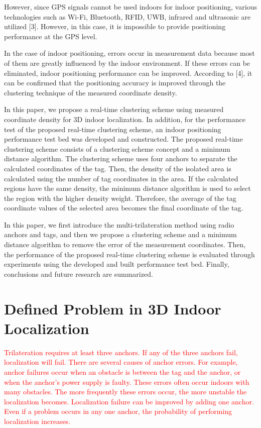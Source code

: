\documentclass[conference]{IEEEtran}
\begin{document}
However, since GPS signals cannot be used indoors for indoor positioning, various technologies such as Wi-Fi, Bluetooth, RFID, UWB, infrared and ultrasonic are utilized [3]. However, in this case, it is impossible to provide positioning performance at the GPS level.

In the case of indoor positioning, errors occur in measurement data because most of them are greatly influenced by the indoor environment. If these errors can be eliminated, indoor positioning performance can be improved. According to [4], it can be confirmed that the positioning accuracy is improved through the clustering technique of the measured coordinate density.

In this paper, we propose a real-time clustering scheme using measured coordinate density for 3D indoor localization. In addition, for the performance test of the proposed real-time clustering scheme, an indoor positioning performance test bed was developed and constructed. The proposed real-time clustering scheme consists of a clustering scheme concept and a minimum distance algorithm. The clustering scheme uses four anchors to separate the calculated coordinates of the tag. Then, the density of the isolated area is calculated using the number of tag coordinates in the area. If the calculated regions have the same density, the minimum distance algorithm is used to select the region with the higher density weight. Therefore, the average of the tag coordinate values of the selected area becomes the final coordinate of the tag.

In this paper, we first introduce the multi-trilateration method using radio anchors and tags, and then we propose a clustering scheme and a minimum distance algorithm to remove the error of the measurement coordinates. Then, the performance of the proposed real-time clustering scheme is evaluated through experiments using the developed and built performance test bed. Finally, conclusions and future research are summarized.


\section{Defined Problem in 3D Indoor Localization}

\textcolor{red}{Trilateration requires at least three anchors. If any of the three anchors fail, localization will fail. There are several causes of anchor errors. For example, anchor failures occur when an obstacle is between the tag and the anchor, or when the anchor's power supply is faulty. These errors often occur indoors with many obstacles. The more frequently these errors occur, the more unstable the localization becomes\cite{b7}.
    Localization failure can be improved by adding one anchor.
    Even if a problem occurs in any one anchor, the probability of performing localization increases\cite{b8}.}
\end{document}
